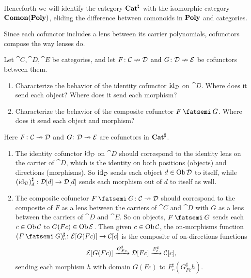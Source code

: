 \documentclass[Book-Poly]{subfiles}
\begin{document}
Henceforth we will identify the category $\mathbf{Cat}^\sharp$ with the isomorphic category $\mathbf{Comon}(\mathbf{Poly})$, eliding the difference between comonoids in $\mathbf{Poly}$ and categories.

Since each cofunctor includes a lens between its carrier polynomials, cofunctors compose the way lenses do.

\begin{exercise}
Let $\cat{C},\cat{D},\cat{E}$ be categories, and let $F\colon\mathcal{C}\nrightarrow\mathcal{D}$ and $G\colon\mathcal{D}\nrightarrow\mathcal{E}$ be cofunctors between them.
\begin{enumerate}
    \item Characterize the behavior of the identity cofunctor $\mathrm{id}_{\mathcal{D}}$ on $\cat{D}$.
    Where does it send each object?
    Where does it send each morphism?
    \item Characterize the behavior of the composite cofunctor $F\then G$.
    Where does it send each object and morphism?\qedhere
\end{enumerate}
\begin{solution}
Here $F\colon\mathcal{C}\nrightarrow\mathcal{D}$ and $G\colon\mathcal{D}\nrightarrow\mathcal{E}$ are cofunctors in $\mathbf{Cat}^\sharp$.
\begin{enumerate}
    \item The identity cofunctor $\mathrm{id}_{\mathcal{D}}$ on $\cat{D}$ should correspond to the identity lens on the carrier of $\cat{D}$, which is the identity on both positions (objects) and directions (morphisms).
    So $\mathrm{id}_{\mathcal{D}}$ sends each object $d\in\operatorname{Ob}\mathcal{D}$ to itself, while $\left(\mathrm{id}_{\mathcal{D}}\right)^\sharp_d\colon\mathcal{D}[d]\to\mathcal{D}[d]$ sends each morphism out of $d$ to itself as well.
    \item The composite cofunctor $F\then G\colon\cat{C}\cof\cat{D}$ should correspond to the composite of $F$ as a lens between the carriers of $\cat{C}$ and $\cat{D}$ with $G$ as a lens between the carriers of $\cat{D}$ and $\cat{E}$.
    So on objects, $F\then G$ sends each $c\in\operatorname{Ob}\mathcal{C}$ to $G(Fc)\in\operatorname{Ob}\mathcal{E}$.
    Then given $c\in\operatorname{Ob}\mathcal{C}$, the on-morphisms function $(F\then G)^\sharp_c\colon\cat{E}[G(Fc)]\to\cat{C}[c]$ is the composite of on-directions functions
    \[
        \mathcal{E}[G(Fc)]\xrightarrow{G^\sharp_{Fc}}\mathcal{D}[Fc]\xrightarrow{F^\sharp_c}\mathcal{C}[c],
    \]
    sending each morphism $h$ with domain $G(Fc)$ to $F^\sharp_c\left(G^\sharp_{Fc}h\right)$.
\end{enumerate}
\end{solution}
\end{exercise}
\end{document}
